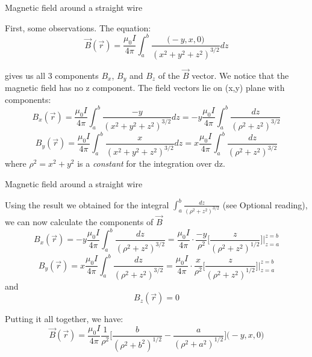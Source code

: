 %
%
%

\begin{frame}{Magnetic field around a straight wire}

First, some observations. The equation:
\begin{equation*}
  \vec{B}(\vec{r}) =
     \frac{\mu_0I}{4\pi} \int_{a}^{b} \frac{\Big(-y, x, 0 \Big)}{(x^2+y^2+z^2)^{3/2}} dz
\end{equation*}

gives us all 3 components $B_{x}$, $B_{y}$ and $B_{z}$ of the $\vec{B}$ vector.
We notice that the magnetic field has no z component.
The field vectors lie on (x,y) plane with components:
\begin{equation*}
  B_{x}(\vec{r}) =
     \frac{\mu_0I}{4\pi} \int_{a}^{b} \frac{-y}{(x^2+y^2+z^2)^{3/2}} dz =
     -y \frac{\mu_0I}{4\pi} \int_{a}^{b} \frac{dz}{({\rho}^2+z^2)^{3/2}}
\end{equation*}
\begin{equation*}
  B_{y}(\vec{r}) =
     \frac{\mu_0I}{4\pi} \int_{a}^{b} \frac{x}{(x^2+y^2+z^2)^{3/2}} dz =
     x \frac{\mu_0I}{4\pi} \int_{a}^{b} \frac{dz}{({\rho}^2+z^2)^{3/2}}
\end{equation*}
where ${\rho}^2 = x^2+y^2$ is a {\em constant} for the integration over dz.

\end{frame}


%
%
%

\begin{frame}{Magnetic field around a straight wire}

Using the result we obtained for the integral $\int_{a}^{b}
\frac{dz}{({\rho}^2+z^2)^{3/2}}$ (see Optional reading),
we can now calculate the components of $\vec{B}$
\begin{equation*}
  B_{x}(\vec{r}) =
     -y \frac{\mu_0I}{4\pi} \int_{a}^{b} \frac{dz}{({\rho}^2+z^2)^{3/2}} =
     \frac{\mu_0I}{4\pi} \cdot \frac{-y}{{\rho}^{2}} \Big[ \frac{z}{({\rho}^{2}+z^{2})^{1/2}} \Big] \biggr\rvert_{z=a}^{z=b}
\end{equation*}
\begin{equation*}
  B_{y}(\vec{r}) =
     x \frac{\mu_0I}{4\pi} \int_{a}^{b} \frac{dz}{({\rho}^2+z^2)^{3/2}} =
     \frac{\mu_0I}{4\pi} \cdot \frac{x}{{\rho}^{2}} \Big[ \frac{z}{({\rho}^{2}+z^{2})^{1/2}} \Big] \biggr\rvert_{z=a}^{z=b}
\end{equation*}
and
\begin{equation*}
  B_{z}(\vec{r}) = 0
\end{equation*}

Putting it all together, we have:
\begin{equation*}
  \vec{B}(\vec{r}) = \frac{\mu_0I}{4\pi} \frac{1}{{\rho}^{2}}
    \Big[ \frac{b}{({\rho}^{2}+b^{2})^{1/2}} - \frac{a}{({\rho}^{2}+a^{2})^{1/2}}\Big] \Big( -y, x, 0 \Big)
\end{equation*}

\end{frame}


